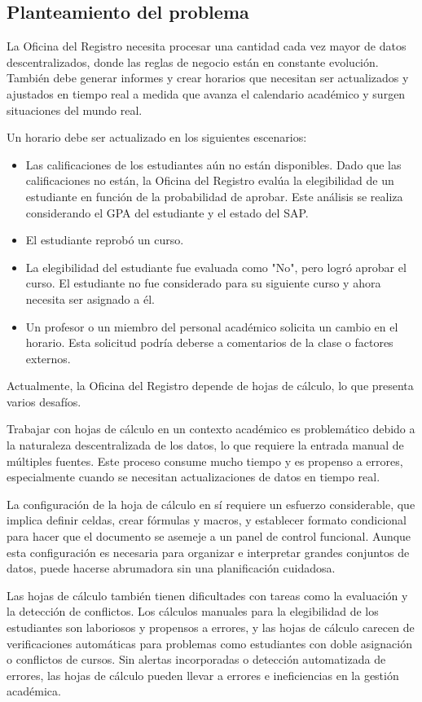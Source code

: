 \subsection{Planteamiento del problema}
La Oficina del Registro necesita procesar una cantidad cada vez mayor de datos descentralizados, donde las reglas de negocio están en constante evolución.
También debe generar informes y crear horarios que necesitan ser actualizados y ajustados en tiempo real a medida que avanza el calendario académico y surgen situaciones del mundo real.

Un horario debe ser actualizado en los siguientes escenarios:
\begin{itemize}
    \item Las calificaciones de los estudiantes aún no están disponibles.
Dado que las calificaciones no están, la Oficina del Registro evalúa la elegibilidad de un estudiante en función de la probabilidad de aprobar. Este análisis se realiza considerando el GPA del estudiante y el estado del SAP.
    \item El estudiante reprobó un curso.
    \item La elegibilidad del estudiante fue evaluada como "No", pero logró aprobar el curso.
El estudiante no fue considerado para su siguiente curso y ahora necesita ser asignado a él.
    \item Un profesor o un miembro del personal académico solicita un cambio en el horario.
Esta solicitud podría deberse a comentarios de la clase o factores externos.
\end{itemize}

Actualmente, la Oficina del Registro depende de hojas de cálculo, lo que presenta varios desafíos.

Trabajar con hojas de cálculo en un contexto académico es problemático debido a la naturaleza descentralizada de los datos, lo que requiere la entrada manual de múltiples fuentes.
Este proceso consume mucho tiempo y es propenso a errores, especialmente cuando se necesitan actualizaciones de datos en tiempo real.

La configuración de la hoja de cálculo en sí requiere un esfuerzo considerable, que implica definir celdas, crear fórmulas y macros, y establecer formato condicional para hacer que el documento se asemeje a un panel de control funcional.
Aunque esta configuración es necesaria para organizar e interpretar grandes conjuntos de datos, puede hacerse abrumadora sin una planificación cuidadosa.

Las hojas de cálculo también tienen dificultades con tareas como la evaluación y la detección de conflictos.
Los cálculos manuales para la elegibilidad de los estudiantes son laboriosos y propensos a errores, y las hojas de cálculo carecen de verificaciones automáticas para problemas como estudiantes con doble asignación o conflictos de cursos. Sin alertas incorporadas o detección automatizada de errores, las hojas de cálculo pueden llevar a errores e ineficiencias en la gestión académica.

